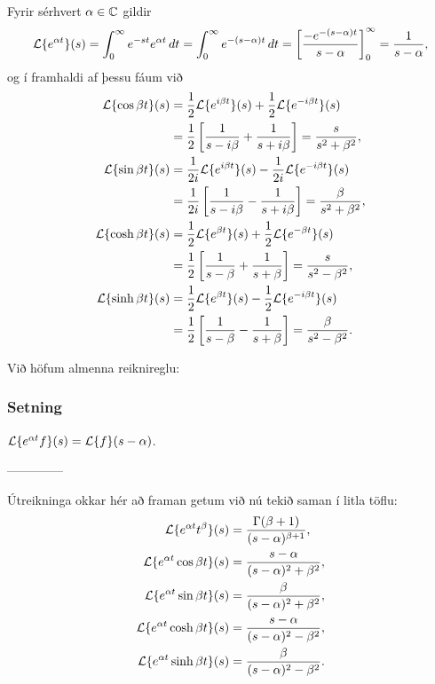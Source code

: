 \smallskip
Fyrir sérhvert $\alpha\in {\mathbb C}$ gildir
 $$
{\cal L}\{e^{\alpha t}\}(s)=
\int_0^{\infty}e^{-st}e^{\alpha t}\, dt =
\int_0^{\infty}e^{-(s-\alpha)t}\, dt =
\left[\dfrac {-e^{-(s-\alpha)t}} {s-\alpha}\right]_0^{\infty}=
\dfrac 1{s-\alpha},
 $$
og í framhaldi af þessu fáum við
\begin{align*}
{\cal L}\{\cos\beta t\}(s) &=
\frac 12 {\cal L}\{e^{i\beta t}\}(s) +\frac 12{\cal L}\{e^{-i\beta t}\}(s)\\
&=\frac 12\left[\dfrac 1{s-i\beta}+\dfrac 1{s+i\beta}\right]
=\dfrac s{s^2+\beta^2},\\
{\cal L}\{\sin\beta t\}(s) &=
\frac 1{2i}{\cal L}\{e^{i\beta t}\}(s) -\frac 1{2i}{\cal L}\{e^{-i\beta t}\}(s)\\
&=\frac 1{2i}\left[\dfrac 1{s-i\beta}-\dfrac 1{s+i\beta}\right]
=\dfrac {\beta}{s^2+\beta^2},\\
{\cal L}\{\cosh \beta t\}(s) &= 
\frac 12 {\cal L}\{e^{\beta t}\}(s) +\frac 12{\cal L}\{e^{-\beta t}\}(s)\\
&=\frac 12\left[\dfrac 1{s-\beta}+\dfrac 1{s+\beta}\right]
=\dfrac s{s^2-\beta^2},\\
{\cal L}\{\sinh \beta t\}(s) &= 
\frac 1{2}{\cal L}\{e^{\beta t}\}(s) -\frac 1{2}{\cal L}\{e^{-i\beta t}\}(s)\\
&=\frac 1{2}\left[\dfrac 1{s-\beta}-\dfrac 1{s+\beta}\right]
=\dfrac \beta{s^2-\beta^2}.
\end{align*}


Við höfum almenna reiknireglu:

\subsubsection{Setning} ${\cal L}\{e^{\alpha t}f\}(s) = {\cal L}\{f\}(s-\alpha)$.


--------------



Útreikninga okkar hér að framan getum við  nú  tekið saman í litla
töflu: 
\begin{align*}
{\cal L}\{e^{\alpha t}t^{\beta}\}(s)
&=\dfrac{\Gamma(\beta+1)}{(s-\alpha)^{\beta+1}},\\
{\cal L}\{e^{\alpha t}\cos \beta t\}(s)
&=\dfrac{s-\alpha}{(s-\alpha)^2+\beta^2},\\
{\cal L}\{e^{\alpha t}\sin \beta t\}(s)
&=\dfrac{\beta}{(s-\alpha)^2+\beta^2},\\
{\cal L}\{e^{\alpha t}\cosh \beta t\}(s)
&=\dfrac{s-\alpha}{(s-\alpha)^2-\beta^2},\\
{\cal L}\{e^{\alpha t}\sinh \beta t\}(s)
&=\dfrac{\beta}{(s-\alpha)^2-\beta^2}.
\end{align*}


